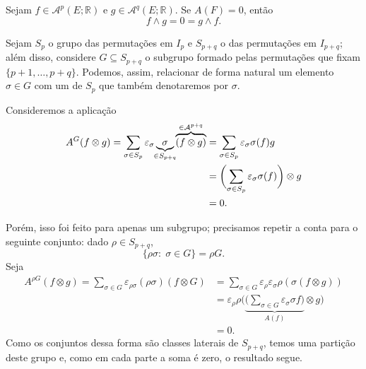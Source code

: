 \documentclass[../differential_forms.tex]{subfiles}
\begin{document}
\begin{lemma*}
	Sejam \(f\in \mathcal{A}^{p}(E; \mathbb{R})\) e \(g\in \mathcal{A}^{q}(E; \mathbb{R})\). Se \(A(F) = 0 \), então
	\[
		f \wedge g = 0 = g \wedge f.
	\]
\end{lemma*}
\begin{proof*}
	Sejam \(S_{p}\) o grupo das permutações em \(I_{p}\) e \(S_{p+q}\) o das permutações em \(I_{p+q}\); além disso, considere \(G\subseteq S_{p+q}\) o subgrupo formado
	pelas permutações que fixam \(\{p+1, \dotsc , p+q\}\). Podemos, assim, relacionar de forma natural um elemento \(\sigma \in G\) com um de \(S_{p}\) que também denotaremos
	por \(\sigma\).

	Consideremos a aplicação
	\begin{align*}
		A^{G}(f \otimes g) = \sum\limits_{\sigma \in S_{p}}^{}\varepsilon_{\sigma }\underbrace{\sigma}_{\mathclap{\in S_{p+q}}} \overbrace{(f\otimes g)}^{\in \mathcal{A}^{p+q}} & = \sum\limits_{\sigma \in S_{p}}^{}\varepsilon_{\sigma }\sigma (f)g                       \\
		                                                                                                                                                                         & = \biggl(\sum\limits_{\sigma \in S_{p}}^{}\varepsilon_{\sigma }\sigma (f)\biggr)\otimes g \\
		                                                                                                                                                                         & = 0.
	\end{align*}

	Porém, isso foi feito para apenas um subgrupo; precisamos repetir a conta para o seguinte conjunto: dado \(\rho \in S_{p+q}\),
	\[
		\{\rho \sigma :\; \sigma \in G\} = \rho G.
	\]
	Seja
	\begin{align*}
		A^{\rho G}(f\otimes g) = \sum\limits_{\sigma \in G}^{}\varepsilon_{\rho \sigma }(\rho \sigma )(f\otimes G) & = \sum\limits_{\sigma \in G}^{}\varepsilon_{\rho }\varepsilon_{\sigma }\rho (\sigma (f\otimes g))                                           \\
		                                                                                                           & = \varepsilon_{\rho }\rho \biggl(\underbrace{\bigl(\sum\limits_{\sigma \in G}^{}\varepsilon_{\sigma }\sigma f\bigr)}_{A(f)}\otimes g\biggr) \\
		                                                                                                           & = 0.
	\end{align*}
	Como os conjuntos dessa forma são classes laterais de \(S_{p+q}\), temos uma partição deste grupo e, como em cada parte a soma é zero, o resultado segue. \qedsymbol
\end{proof*}
\end{document}
